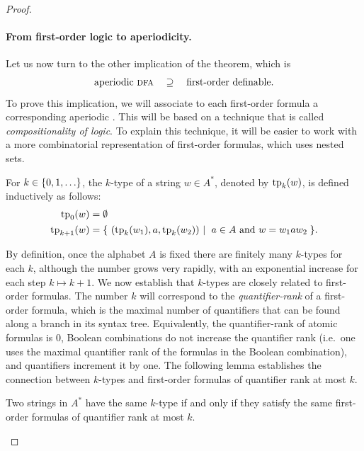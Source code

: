 \begin{proof}
    \newcommand{\equivclass}[2]{#1_{/#2}}

    \paragraph*{From first-order logic to aperiodicity.}
    Let us now turn to the other implication of the theorem, which is 
    \begin{align*}
    \text{aperiodic \textsc{dfa}} \quad \supseteq \quad \text{first-order definable}.
    \end{align*}
    To prove this implication, we will associate to each first-order formula a corresponding aperiodic \dfa. This will be based on a technique that is called \emph{compositionality of logic}. 
    To explain this technique, it will be easier to work with a more combinatorial representation of first-order formulas, which uses nested sets.
    
    \begin{definition}[$k$-types]\label{def:k-types}
        For $k \in \{0,1,\ldots\}$, the $k$-type of a string $w \in A^*$, denoted by $\text{tp}_k(w)$, is defined inductively as follows:
    \begin{align*}
        \fotype_0(w) & = \emptyset \\
        \fotype_{k+1}(w) & = \setbuild{ (\fotype_k(w_1), a, \fotype_k(w_2))}{$a \in A$ and $w = w_1 a w_2$}.
    \end{align*}
    \end{definition}

By definition, once the alphabet $A$ is fixed there are finitely many $k$-types for each $k$, although the number grows very rapidly, with an exponential increase for each step $k \mapsto k+1$. We now establish that $k$-types are closely related to first-order formulas. The number $k$ will correspond to the  \emph{quantifier-rank} of a first-order formula, which is the  maximal number of quantifiers that can be found along a branch in its syntax tree. Equivalently, the quantifier-rank of atomic formulas is 0, Boolean combinations do not increase the quantifier rank (i.e.~one uses the maximal quantifier rank of the formulas in the Boolean combination), and quantifiers increment it by one. The following lemma establishes the connection between $k$-types and first-order formulas of quantifier rank at most $k$.


\begin{lemma}\label{lem:k-types-fo-equivalence}
    Two strings in $A^*$ have the same $k$-type if and only if they satisfy the same first-order formulas of quantifier rank at most $k$.
\end{lemma}


\end{proof}
